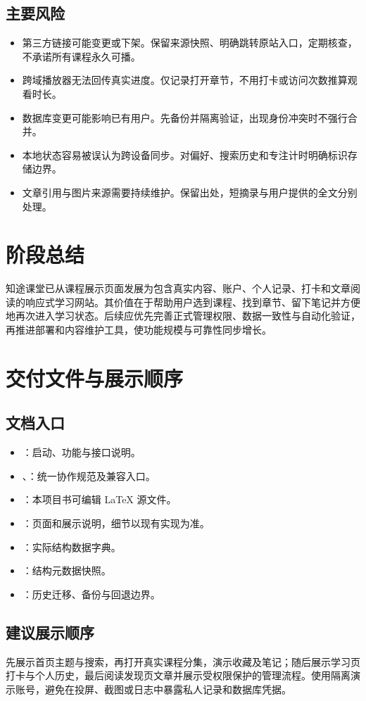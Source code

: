 \documentclass[UTF8,12pt,a4paper,openany,oneside]{ctexbook}
\newcommand{\project}{知途课堂}
\begin{document}
\section{主要风险}
\begin{itemize}
\item 第三方链接可能变更或下架。保留来源快照、明确跳转原站入口，定期核查，不承诺所有课程永久可播。
\item 跨域播放器无法回传真实进度。仅记录打开章节，不用打卡或访问次数推算观看时长。
\item 数据库变更可能影响已有用户。先备份并隔离验证，出现身份冲突时不强行合并。
\item 本地状态容易被误认为跨设备同步。对偏好、搜索历史和专注计时明确标识存储边界。
\item 文章引用与图片来源需要持续维护。保留出处，短摘录与用户提供的全文分别处理。
\end{itemize}

\chapter{阶段总结}
\project 已从课程展示页面发展为包含真实内容、账户、个人记录、打卡和文章阅读的响应式学习网站。其价值在于帮助用户选到课程、找到章节、留下笔记并方便地再次进入学习状态。后续应优先完善正式管理权限、数据一致性与自动化验证，再推进部署和内容维护工具，使功能规模与可靠性同步增长。

\appendix
\chapter{交付文件与展示顺序}
\section{文档入口}
\begin{itemize}
\item {}：启动、功能与接口说明。
\item {}、：统一协作规范及兼容入口。
\item {}：本项目书可编辑 LaTeX 源文件。
\item {}：页面和展示说明，细节以现有实现为准。
\item {}：实际结构数据字典。
\item {}：结构元数据快照。
\item {}：历史迁移、备份与回退边界。
\end{itemize}

\section{建议展示顺序}
先展示首页主题与搜索，再打开真实课程分集，演示收藏及笔记；随后展示学习页打卡与个人历史，最后阅读发现页文章并展示受权限保护的管理流程。使用隔离演示账号，避免在投屏、截图或日志中暴露私人记录和数据库凭据。
\end{document}
